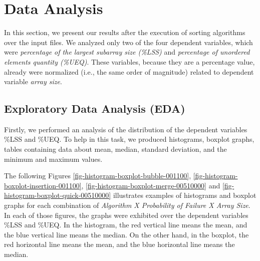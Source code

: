 \section{Data Analysis}

In this section, we present our results after the execution of sorting algorithms over the input files. We analyzed only two of the four dependent variables, which were \textit{percentage of the largest subarray size (\%LSS)} and \textit{percentage of unordered elements quantity (\%UEQ)}. These variables, because they are a percentage value, already were normalized (i.e., the same order of magnitude) related to dependent variable \textit{array size}.

\subsection{Exploratory Data Analysis (EDA)}

Firstly, we performed an analysis of the distribution of the dependent variables \%LSS and \%UEQ. To help in this task, we produced histograms, boxplot graphs, tables containing data about mean, median, standard deviation, and the minimum and maximum values.

The following Figures \ref{fig-histogram-boxplot-bubble-001100}, \ref{fig-histogram-boxplot-insertion-001100}, \ref{fig-histogram-boxplot-merge-00510000} and \ref{fig-histogram-boxplot-quick-00510000} illustrates examples of histograms and boxplot graphs for each combination of \textit{Algorithm X Probability of Failure X Array Size}. In each of those figures, the graphs were exhibited over the dependent variables \%LSS and \%UEQ.  In the histogram, the red vertical line means the mean, and the blue vertical line means the median. On the other hand, in the boxplot, the red horizontal line means the mean, and the blue horizontal line means the median.

